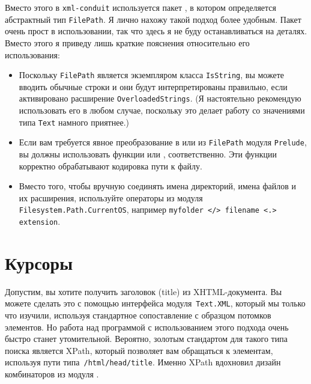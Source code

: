 Вместо этого в \lstinline!xml-conduit! используется пакет , в котором определяется абстрактный тип \lstinline!FilePath!. Я лично нахожу такой подход более удобным. Пакет очень прост в использовании, так что здесь я не буду останавливаться на деталях. Вместо этого я приведу лишь краткие пояснения относительно его использования:
\begin{itemize}
\item Поскольку \lstinline!FilePath! является экземпляром класса \lstinline!IsString!, вы можете вводить обычные строки и они будут интерпретированы правильно, если активировано расширение \lstinline!OverloadedStrings!. (Я настоятельно рекомендую использовать его в любом случае, поскольку это делает работу со значениями типа \lstinline!Text! намного приятнее.)
\item Если вам требуется явное преобразование в или из \lstinline!FilePath! модуля \lstinline!Prelude!, вы должны использовать функции  или , соответственно. Эти функции корректно обрабатывают кодировка пути к файлу.
\item Вместо того, чтобы вручную соединять имена директорий, имена файлов и их расширения, используйте операторы из модуля \lstinline!Filesystem.Path.CurrentOS!, например \lstinline!myfolder </> filename <.> extension!.
\end{itemize}
  
\section{Курсоры}
Допустим, вы хотите получить заголовок (title) из XHTML-документа. Вы можете сделать это с помощью интерфейса модуля~\lstinline!Text.XML!, который мы только что изучили, используя стандартное сопоставление с образцом потомков элементов. Но работа над программой с использованием этого подхода очень быстро станет утомительной. Вероятно, золотым стандартом для такого типа поиска является XPath, который позволяет вам обращаться к элементам, используя пути типа~\lstinline!/html/head/title!. Именно XPath вдохновил дизайн комбинаторов из модуля .

